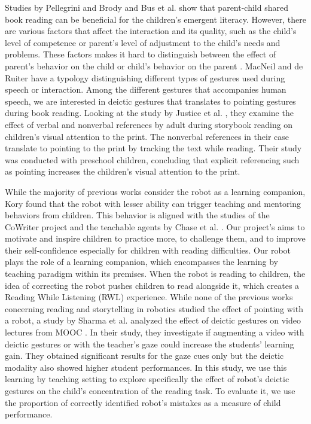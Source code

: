 \documentclass{sigchi}
\begin{document}
Studies by Pellegrini and Brody \cite{pellegrini1985parents} and Bus et al. \cite{bus1995joint} show that parent-child shared book reading can be beneficial for the children's emergent literacy.
However, there are various factors that affect the interaction and its quality, such as the child's level of competence or parent's level of adjustment to the child's needs and problems.
These factors makes it hard to distinguish between the effect of parent's behavior on the child or child's behavior on the parent \cite{pellegrini1985parents}.  
MacNeil \cite{mcneill1992hand} and de Ruiter \cite{de200014} have a typology distinguishing different types of gestures used during speech or interaction. 
Among the different gestures that accompanies human speech, we are interested in deictic gestures that translates to pointing gestures during book reading.
Looking at the study by Justice et al. \cite{justice2008influence}, they examine the effect of verbal and nonverbal references by adult during storybook reading on children's visual attention to the print. 
The nonverbal references in their case translate to pointing to the print by tracking the text while reading.
Their study was conducted with preschool children, concluding that explicit referencing such as pointing increases the children's visual attention to the print. 

\setlength{\parskip}{2em}

While the majority of previous works consider the robot as a learning companion, Kory \cite{kory2014storytelling} found that the robot with lesser ability can trigger teaching and mentoring behaviors from children.
This behavior is aligned with the studies of the CoWriter project and the teachable agents by Chase et al. \cite{hood2015children,chase2009teachable}.
Our project's aims to motivate and inspire children to practice more, to challenge them, and to improve their self-confidence especially for children with reading difficulties. 
Our robot plays the role of a learning companion, which encompasses the learning by teaching paradigm within its premises.  
When the robot is reading to children, the idea of correcting the robot pushes children to read alongside it, which creates a Reading While Listening (RWL) experience.
While none of the previous works concerning reading and storytelling in robotics studied the effect of pointing with a robot, a study by Sharma et al. \cite{sharma2016visual} analyzed the effect of deictic gestures on video lectures from MOOC . 
In their study, they investigate if augmenting a video with deictic gestures or with the teacher's gaze could increase the students' learning gain. They obtained significant results for the gaze cues only but the deictic modality also showed higher student performances.
In this study, we use this learning by teaching setting to explore specifically the effect of robot's deictic gestures on the child's concentration of the reading task. 
To evaluate it, we use the proportion of correctly identified robot's mistakes as a measure of child performance.
\end{document}
